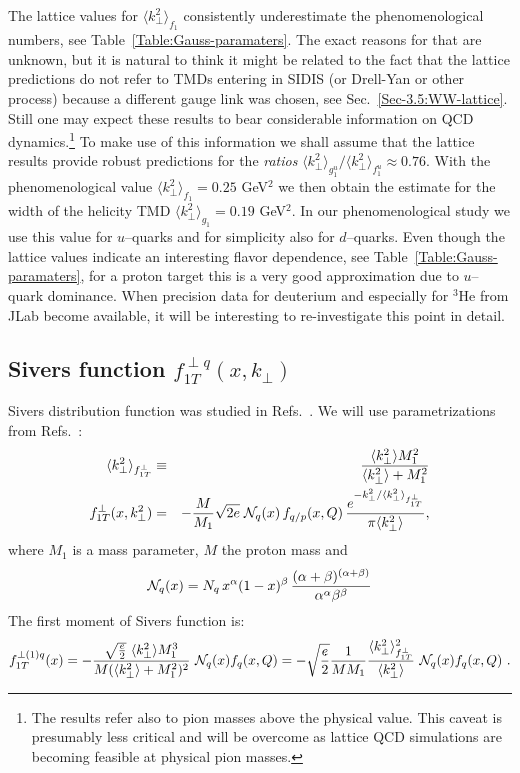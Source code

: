 \documentclass[a4paper,11pt]{article}
\newcommand{\ba}{\begin{eqnarray}}
\newcommand{\ea}{\end{eqnarray}}
\newcommand{\la}{\langle}
\newcommand{\ra}{\rangle}
\def\kperp{k_\perp}
\def\avkperp{\la \kperp^2 \ra}
\begin{document}
The lattice values for $\langle \kperp^2 \rangle_{f_1}$ consistently 
underestimate the phenomenological numbers, see 
Table~\ref{Table:Gauss-paramaters}.
The exact reasons for that are unknown, but it is natural to think it
might be related to the fact that the lattice predictions \cite{Hagler:2009mb}
do not refer to TMDs entering in SIDIS (or Drell-Yan or other process) 
because a different gauge link was chosen, see Sec.~\ref{Sec-3.5:WW-lattice}. 
Still one may expect these results to bear considerable information 
on QCD dynamics.\footnote{
	The results \cite{Hagler:2009mb} refer also to pion masses above the 
	physical value. This caveat is presumably less critical and
	will be overcome as lattice QCD simulations are becoming feasible 
	at physical pion masses.}
To make use of this information we shall assume that the lattice results
\cite{Hagler:2009mb} provide robust predictions for the {\it ratios}
$\langle \kperp^2 \rangle_{g_1^u}/\langle \kperp^2 \rangle_{f_1^u}\approx 0.76$.
With the phenomenological value $\langle \kperp^2 \rangle_{f_1} = 0.25$ GeV$^2$ 
we then obtain the estimate for the width of the helicity TMD
$\langle \kperp^2 \rangle_{g_1} = 0.19$ GeV$^2$.
In our phenomenological study we use this value for $u$--quarks and for 
simplicity also for $d$--quarks. Even though the lattice values indicate 
an interesting flavor dependence, see Table~\ref{Table:Gauss-paramaters},
for a proton target this is a very good approximation due to $u$--quark 
dominance. When precision data for deuterium and especially for $^3$He
from JLab become available, it will be interesting to 
re-investigate this point in detail.

\subsection{\boldmath Sivers function $f_{1T}^{\perp q}(x,k_\perp)$}
\label{App:basis-f1Tperp}

Sivers distribution function was studied in Refs.~\cite{Efremov:2004tp,Anselmino:2008sga,Anselmino:2011gs,Anselmino:2011ch, Aybat:2011ge,Gamberg:2013kla,Bacchetta:2011gx,Anselmino:2012aa,Sun:2013dya,Echevarria:2014xaa}. 
We will use parametrizations from  Refs.~\cite{Anselmino:2008sga,Anselmino:2011gs,Anselmino:2011ch}:
\ba
 \avkperp_{f_{1T}^\perp} &\equiv& \frac{\avkperp M_1^2}{\avkperp + M_1^2} \\
f_{1T}^{\perp}(x, \kperp^2)& =& - \frac {M}{M_1} \sqrt{2e} \;
{\cal N}_q(x) \, f_{q/p} (x,Q) \, \frac{e^{-\kperp^2/{\avkperp_{f_{1T}^\perp}}}}{\pi \avkperp} ,
\label{fiTp}
\ea
%
where $M_1$ is a mass parameter, $M$ the proton mass and
%
\ba
{\cal N}_q(x)= N_q \, x^{\alpha} (1-x)^{\beta} \,
\frac{(\alpha + \beta)^{(\alpha +\beta)}}
{\alpha^{\alpha} \beta^{\beta}}
 \ea
The first moment of Sivers function is:
\ba
f_{1T}^{\perp (1) q}(x)  = -\frac{\sqrt{\frac{e}{2}} \ \avkperp M_1^3}{M (\avkperp + M_1^2)^2}  \ {\cal N}_q(x)  f_q(x, Q) = -\sqrt{\frac{e}{2}} \frac{1}{M M_1}  \frac{\avkperp_{f_{1T}^\perp}^2}{\avkperp}    \ {\cal N}_q(x)  f_q(x, Q)
\label{siversm} \ .
\ea
\end{document}
